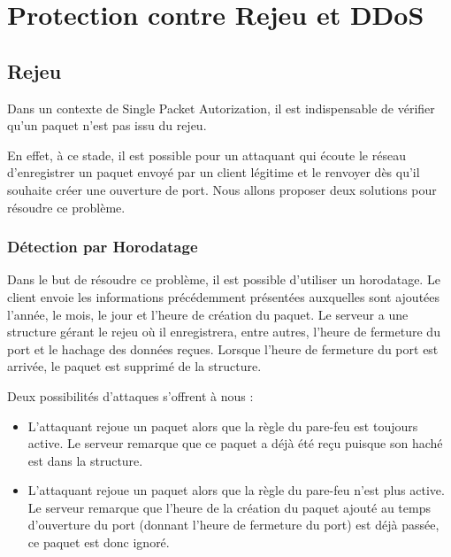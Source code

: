 \chapter{Protection contre Rejeu et DDoS}

\section{Rejeu}

Dans un contexte de Single Packet Autorization, il est indispensable de vérifier qu'un paquet n'est pas issu du rejeu.

En effet, à ce stade, il est possible pour un attaquant qui écoute le réseau d'enregistrer un paquet envoyé par un client légitime et le renvoyer dès qu'il souhaite créer une ouverture de port. Nous allons proposer deux solutions pour résoudre ce problème.

\subsection{Détection par Horodatage}

Dans le but de résoudre ce problème, il est possible d'utiliser un horodatage. Le client envoie les informations précédemment présentées auxquelles sont ajoutées l'année, le mois, le jour et l'heure de création du paquet. Le serveur a une structure gérant le rejeu où il enregistrera, entre autres, l'heure de fermeture du port et le hachage des données reçues. Lorsque l'heure de fermeture du port est arrivée, le paquet est supprimé de la structure.

Deux possibilités d'attaques s'offrent à nous :

\begin{itemize}

\item L'attaquant rejoue un paquet alors que la règle du pare-feu est toujours active. Le serveur remarque que ce paquet a déjà été reçu puisque son haché est dans la structure.

\item L'attaquant rejoue un paquet alors que la règle du pare-feu n'est plus active. Le serveur remarque que l'heure de la création du paquet ajouté au temps d'ouverture du port (donnant l'heure de fermeture du port) est déjà passée, ce paquet est donc ignoré.

\end{itemize}

\vspace{0.5cm}

